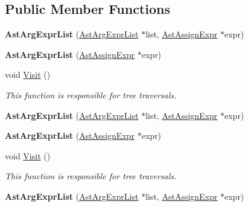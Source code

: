 \subsection*{Public Member Functions}
\begin{DoxyCompactItemize}
\item 
\hypertarget{classAstArgExprList_a6aafae6eaadd5db52a33768136657610}{{\bfseries Ast\-Arg\-Expr\-List} (\hyperlink{classAstArgExprList}{Ast\-Arg\-Expr\-List} $\ast$list, \hyperlink{classAstAssignExpr}{Ast\-Assign\-Expr} $\ast$expr)}\label{classAstArgExprList_a6aafae6eaadd5db52a33768136657610}

\item 
\hypertarget{classAstArgExprList_a4acc4d03bbbe66b9a19e991d21169414}{{\bfseries Ast\-Arg\-Expr\-List} (\hyperlink{classAstAssignExpr}{Ast\-Assign\-Expr} $\ast$expr)}\label{classAstArgExprList_a4acc4d03bbbe66b9a19e991d21169414}

\item 
void \hyperlink{classAstArgExprList_aeac192a90197b0de59114cea84a1e577}{Visit} ()
\begin{DoxyCompactList}\small\item\em This function is responsible for tree traversals. \end{DoxyCompactList}\item 
\hypertarget{classAstArgExprList_a6aafae6eaadd5db52a33768136657610}{{\bfseries Ast\-Arg\-Expr\-List} (\hyperlink{classAstArgExprList}{Ast\-Arg\-Expr\-List} $\ast$list, \hyperlink{classAstAssignExpr}{Ast\-Assign\-Expr} $\ast$expr)}\label{classAstArgExprList_a6aafae6eaadd5db52a33768136657610}

\item 
\hypertarget{classAstArgExprList_a4acc4d03bbbe66b9a19e991d21169414}{{\bfseries Ast\-Arg\-Expr\-List} (\hyperlink{classAstAssignExpr}{Ast\-Assign\-Expr} $\ast$expr)}\label{classAstArgExprList_a4acc4d03bbbe66b9a19e991d21169414}

\item 
void \hyperlink{classAstArgExprList_aeac192a90197b0de59114cea84a1e577}{Visit} ()
\begin{DoxyCompactList}\small\item\em This function is responsible for tree traversals. \end{DoxyCompactList}\item 
\hypertarget{classAstArgExprList_a6aafae6eaadd5db52a33768136657610}{{\bfseries Ast\-Arg\-Expr\-List} (\hyperlink{classAstArgExprList}{Ast\-Arg\-Expr\-List} $\ast$list, \hyperlink{classAstAssignExpr}{Ast\-Assign\-Expr} $\ast$expr)}\label{classAstArgExprList_a6aafae6eaadd5db52a33768136657610}


\end{DoxyCompactItemize}
